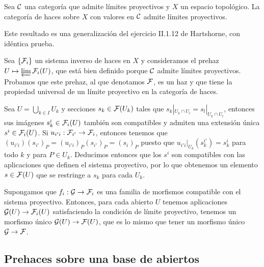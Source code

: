 \documentclass[twoside]{article}
\begin{document}
\begin{prop}[EGA, 0-3.2.6]\label{limite}
Sea ${\mathcal C}$ una categoría que admite límites proyectivos y $X$ un espacio topológico. La categoría de haces sobre $X$ con valores en ${\mathcal C}$ admite límites proyectivos. 
\end{prop}
\begin{dem}
Este resultado es una generalización del ejercicio II.1.12 de Hartshorne, con idéntica prueba.

Sea $\{\mathcal{F}_i\}$ un sistema inverso de haces en $X$ y consideramos el prehaz $U\mapsto\varprojlim\mathcal{F}_i(U)$, que está bien definido porque ${\mathcal C}$ admite límites proyectivos. Probamos que este prehaz, al que denotamos $\mathcal{F}$, es un haz y que tiene la propiedad universal de un límite proyectivo en la categoría de haces. 

Sea $U=\bigcup_{k\in I} U_k$ y secciones $s_k\in\mathcal{F}(U_k)$ tales que $s_k|_{U_k\cap U_l}=s_l|_{U_k\cap U_l}$, entonces sus imágenes $s_k^i\in \mathcal{F}_i(U)$ también son compatibles y admiten una extensión única $s^i\in\mathcal{F}_i(U)$. Si $u_{i'i}:\mathcal{F}_{i'}\to\mathcal{F}_i$, entonces tenemos que $(u_{i'i})(s_{i'})_P=(u_{i'i})_P(s_{i'})_P=(s_i)_P$ puesto que $u_{i'i}|_{U_k}(s^{i'}_k)=s^i_k$ para todo $k$ y para $P\in U_k$. Deducimos entonces que los $s^i$ son compatibles con las aplicaciones que definen el sistema proyectivo, por lo que obtenemos un elemento $s\in\mathcal{F}(U)$ que se restringe a $s_k$ para cada $U_k$. 

Supongamos que $f_i:\mathcal{G}\to\mathcal{F}_i$ es una familia de morfismos compatible con el sistema proyectivo. Entonces, para cada abierto $U$ tenemos aplicaciones $\mathcal{G}(U)\to\mathcal{F}_i(U)$ satisfaciendo la condición de límite proyectivo, tenemos un morfismo único $\mathcal{G}(U)\to\mathcal{F}(U)$, que es lo mismo que tener un morfismo único $\mathcal{G}\to\mathcal{F}$. 

\end{dem}

\subsection{Prehaces sobre una base de abiertos}
\end{document}
